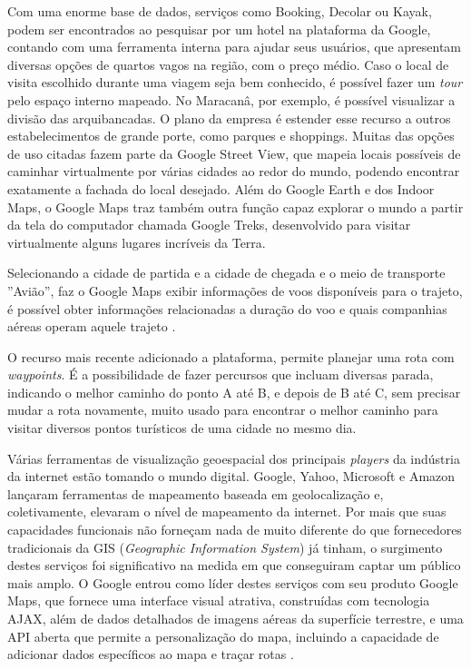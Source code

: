 Com uma enorme base de dados, serviços como Booking, Decolar ou Kayak, podem ser encontrados ao pesquisar por um hotel na plataforma da Google, contando com uma ferramenta interna para ajudar seus usuários, que apresentam diversas opções de quartos vagos na região, com o preço médio. Caso o local de visita escolhido durante uma viagem seja bem conhecido, é possível fazer um \textit{tour} pelo espaço interno mapeado. No Maracanâ, por exemplo, é possível visualizar a divisão das arquibancadas. O plano da empresa é estender esse recurso a outros estabelecimentos de grande porte, como parques e shoppings. Muitas das opções de uso citadas fazem parte da Google Street View, que mapeia locais possíveis de caminhar virtualmente por várias cidades ao redor do mundo, podendo encontrar exatamente a fachada do local desejado. Além do Google Earth e dos Indoor Maps, o Google Maps traz também outra função capaz explorar o mundo a partir da tela do computador chamada Google Treks, desenvolvido para visitar virtualmente alguns lugares incríveis da Terra.

Selecionando a cidade de partida e a cidade de chegada e o meio de transporte ''Avião'', faz o Google Maps exibir informações de voos disponíveis para o trajeto, é possível obter informações relacionadas a duração do voo e quais companhias aéreas operam aquele trajeto \cite{google:2019}. 

O recurso mais recente adicionado a plataforma, permite planejar uma rota com \textit{waypoints}. É a possibilidade de fazer percursos que incluam diversas parada, indicando o melhor caminho do ponto A até B, e depois de B até C, sem precisar mudar a rota novamente, muito usado para encontrar o melhor caminho para visitar diversos pontos turísticos de uma cidade no mesmo dia.

Várias ferramentas de visualização geoespacial dos principais \textit{players} da indústria da internet estão tomando o mundo digital. Google, Yahoo, Microsoft e Amazon lançaram ferramentas de mapeamento baseada em geolocalização e, coletivamente, elevaram o nível de mapeamento da internet. Por mais que suas capacidades funcionais não forneçam nada de muito diferente do que fornecedores tradicionais da GIS (\textit{Geographic Information System}) já tinham, o surgimento destes serviços foi significativo na medida em que conseguiram captar um público mais amplo. O Google entrou como líder destes serviços com seu produto Google Maps, que fornece uma interface visual atrativa, construídas com tecnologia AJAX, além de dados detalhados de imagens aéreas da superfície terrestre, e uma API aberta que permite a personalização do mapa, incluindo a capacidade de adicionar dados específicos ao mapa e traçar rotas \cite{geospatial:2009}.

